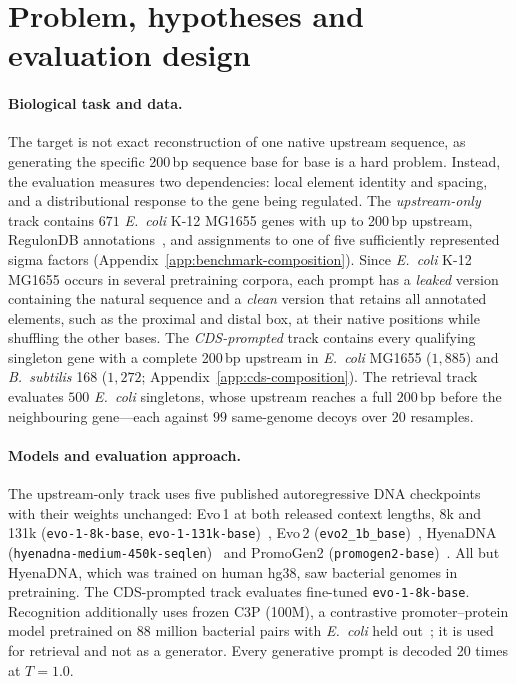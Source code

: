 \documentclass{article}
\begin{document}
\section{Problem, hypotheses and evaluation design}
\label{sec:setup}

\paragraph{Biological task and data.}
The target is not exact reconstruction of one native upstream sequence, as generating the specific 200\,bp sequence base for base is a hard problem. Instead, the evaluation measures two dependencies:
local element identity and spacing, and a distributional response to the gene
being regulated. The
\emph{upstream-only} track contains $671$ \emph{E.~coli} K-12 MG1655 genes with
up to 200\,bp upstream, RegulonDB annotations~\citep{regulondb2024}, and assignments
to one of five sufficiently represented sigma factors
(Appendix~\ref{app:benchmark-composition}). Since \emph{E.~coli} K-12 MG1655 occurs in
several pretraining corpora, each prompt has a \emph{leaked} version containing
the natural sequence and a \emph{clean} version that retains all annotated
elements, such as the proximal and distal box, at their native positions while shuffling the other bases. The
\emph{CDS-prompted} track contains every qualifying singleton gene with a complete
200\,bp upstream in \emph{E.~coli} MG1655 ($1{,}885$) and \emph{B.~subtilis} 168
($1{,}272$; Appendix~\ref{app:cds-composition}). The retrieval track evaluates
$500$ \emph{E.~coli} singletons, whose upstream reaches a full $200$\,bp before the neighbouring gene---each against
$99$ same-genome decoys over $20$ resamples.

\paragraph{Models and evaluation approach.}
The upstream-only track uses five published autoregressive DNA checkpoints with
their weights unchanged: Evo\,1 at both released context lengths, 8k and 131k
(\texttt{evo-1-8k-base}, \texttt{evo-1-131k-base})~\citep{nguyen2024evo}, Evo\,2
(\texttt{evo2\_1b\_base})~\citep{brixi2025evo2}, HyenaDNA
(\texttt{hyenadna-medium-450k-seqlen})~\citep{nguyen2023hyenadna} and PromoGen2
(\texttt{promogen2-base})~\citep{promogen2}. All but HyenaDNA, which was trained on
human hg38, saw bacterial genomes in pretraining. The CDS-prompted track evaluates
fine-tuned \texttt{evo-1-8k-base}. Recognition additionally uses frozen C3P (100M),
a contrastive promoter--protein model pretrained on 88 million bacterial pairs with
\emph{E.~coli} held out~\citep{dufault2026c3p}; it is used for retrieval and not as a
generator. Every generative prompt is decoded 20 times at $T=1.0$.
\end{document}
